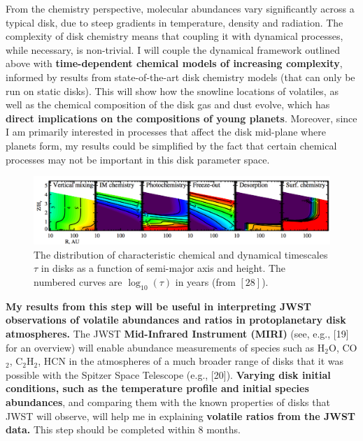 \documentclass[12pt, letterpaper]{article}
\begin{document}
From the chemistry perspective, molecular abundances vary significantly across a typical disk, due to steep gradients in temperature, density and radiation. 
The complexity of disk chemistry means that coupling it with dynamical processes, while necessary, is non-trivial.  I will couple the dynamical framework outlined above with \textbf{time-dependent chemical models of increasing complexity}, informed by results from state-of-the-art disk chemistry models (that can only be run on static disks). This will show how the snowline locations of volatiles, as well as the chemical composition of the disk gas and dust evolve, which has \textbf{direct implications on the compositions of young planets}. Moreover, since I am primarily interested in processes that affect the disk mid-plane where planets form, my results could be simplified by the fact that certain chemical processes may not be important in this disk parameter space.

\begin{figure}[h!]
\centering
\includegraphics[width=\textwidth]{chemical_timescales}
\vspace{-0.3in}
\caption{The distribution of characteristic chemical and dynamical timescales $\tau$ in disks as a function of semi-major axis and height. The numbered curves are $\log_{10} (\tau)$ in years (from $[28]$).}
\label{fig:chemical}
\end{figure}

\textbf{My results from this step will be useful in interpreting JWST observations of volatile abundances and ratios in protoplanetary disk atmospheres.} The JWST \textbf{Mid-Infrared Instrument (MIRI)} (see, e.g., [19] for an overview) will enable abundance measurements of species such as H$_2$O, CO$_2$, C$_2$H$_2$, HCN in the atmospheres of a much broader range of disks that it was possible with the Spitzer Space Telescope (e.g., [20]). \textbf{Varying disk initial conditions, such as the temperature profile and initial species abundances}, and comparing them with the known properties of disks that JWST will observe, will help me in explaining \textbf{volatile ratios from the JWST data.} This step should be completed within 8 months.
\end{document}
